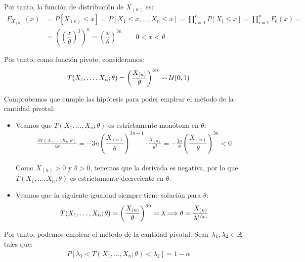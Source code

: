 \begin{ejercicio}
\begin{enumerate}
        Por tanto, la función de distribución de $X_{(n)}$ es:
        \begin{align*}
            F_{X_{(n)}}(x) &= P[X_{(n)} \leq x] = P[X_1 \leq x, \ldots, X_n \leq x] = \prod_{i=1}^{n} P[X_i \le x] = \prod_{i=1}^{n} F_\theta(x) =\\&= \left(\left(\dfrac{x}{\theta}\right)^3\right)^n = \left(\dfrac{x}{\theta}\right)^{3n}\qquad 0 < x < \theta
        \end{align*}

        Por tanto, como función pivote, consideramos:
        \begin{align*}
            T(X_1, \ldots, X_n; \theta) = \left(\dfrac{X_{(n)}}{\theta}\right)^{3n} \rightsquigarrow \mathcal{U}(0, 1)
        \end{align*}

        Comprobemos que cumple las hipótesis para poder emplear el método de la cantidad pivotal:
        \begin{itemize}
            \item Veamos que $T(X_1, \ldots, X_n; \theta)$ es estrictamente monótona en $\theta$:
            \begin{align*}
                \frac{\partial T(X_1, \ldots, X_n; \theta)}{\partial \theta} = -3n\left(\dfrac{X_{(n)}}{\theta}\right)^{3n-1}\cdot \frac{X_{(n)}}{\theta^2} = -\frac{3n}{\theta}\left(\dfrac{X_{(n)}}{\theta}\right)^{3n} < 0
            \end{align*}

            Como $X_{(n)} > 0$ y $\theta > 0$, tenemos que la derivada es negativa, por lo que $T(X_1, \ldots, X_n; \theta)$ es estrictamente decreciente en $\theta$.
            \item Veamos que la siguiente igualdad siempre tiene solución para $\theta$:
            \begin{align*}
                T(X_1, \ldots, X_n; \theta) = \left(\dfrac{X_{(n)}}{\theta}\right)^{3n} = \lambda \Longrightarrow \theta = \dfrac{X_{(n)}}{\lambda^{\nicefrac{1}{3n}}}
            \end{align*}
        \end{itemize}

        Por tanto, podemos emplear el método de la cantidad pivotal. Sean $\lambda_1,\lambda_2\in \mathbb{R}$ tales que:
        \begin{align*}
            P[\lambda_1 < T(X_1, \ldots, X_n; \theta) < \lambda_2] = 1 - \alpha
        \end{align*}


\end{enumerate}
\end{ejercicio}
